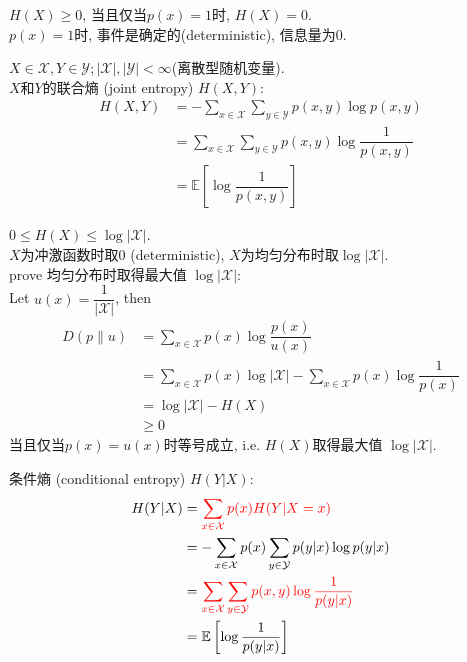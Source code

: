 \begin{proposition}
$H(X)\geq 0$, 当且仅当$p(x)=1$时, $H(X)=0$.\\
$p(x)=1$时, 事件是确定的(deterministic), 信息量为0.
\end{proposition}

\begin{definition}
$X\in \mathcal{X}, Y\in\mathcal{Y}; |\mathcal{X}|,|\mathcal{Y}|<\infty$(离散型随机变量). \\
$X$和$Y$的联合熵 (joint entropy) $H(X,Y)$:
\begin{align*}
    H(X,Y)&= -\sum_{x\in\mathcal{X}}\sum_{y\in\mathcal{Y}}p(x,y)\log p(x,y) \\
        &= \sum_{x\in\mathcal{X}}\sum_{y\in\mathcal{Y}}p(x,y)\log\dfrac{1}{p(x,y)} \\
        &= \mathbb{E}\left[\log\dfrac{1}{p(x,y)}\right]
\end{align*}
\end{definition}

\begin{proposition}
$0\leq H(X)\leq \log|\mathcal{X}|$.\\
$X$为冲激函数时取$0$ (deterministic), $X$为均匀分布时取$\log|\mathcal{X}|$.\\
prove 均匀分布时取得最大值 $\log|\mathcal{X}|$:\\
Let $u(x)=\dfrac{1}{|\mathcal{X}|}$, then
\begin{align*}
D\left(p\|u\right) &= \sum_{x\in\mathcal{X}}p(x)\log\dfrac{p(x)}{u(x)} \\
&= \sum_{x\in\mathcal{X}}p(x)\log|\mathcal{X}| - \sum_{x\in\mathcal{X}}p(x)\log\dfrac{1}{p(x)} \\
&= \log|\mathcal{X}| - H(X) \\
&\geq 0
\end{align*}
当且仅当$p(x)=u(x)$时等号成立, i.e. $H(X)$取得最大值 $\log|\mathcal{X}|$.
\end{proposition}


\begin{definition}
条件熵 (conditional entropy) $H(Y|X)$:
\begin{align*}
    H(Y|X)&= \textcolor{red}{\sum_{x\in\mathcal{X}}p(x)H(Y|X=x)} \\
        &= -\sum_{x\in\mathcal{X}}p(x)\sum_{y\in\mathcal{Y}}p(y|x)\log p(y|x) \\
        &= \textcolor{red}{\sum_{x\in\mathcal{X}}\sum_{y\in\mathcal{Y}}p(x,y)\log\dfrac{1}{p(y|x)}} \\
        &= \mathbb{E}\left[\log\dfrac{1}{p(y|x)}\right]
\end{align*}
\end{definition}

